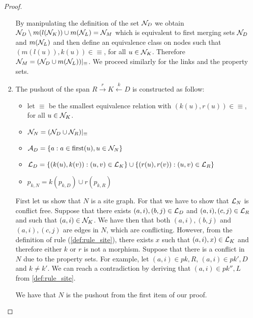 \begin{proof}
\begin{enumerate}
    By manipulating the definition of the set $\mathcal{N}_D$ we obtain $\mathcal{N}_D\setminus m(l(\mathcal{N}_K))\cup m(\mathcal{N}_L) = \mathcal{N}_M$ which is equivalent to first merging sets $\mathcal{N}_D$ and $m(\mathcal{N}_L)$ and then define an equivalence class on nodes such that $(m(l(u)),k(u))\in\equiv$, for all $u\in\mathcal{N}_K$. Therefore $\mathcal{N}_M = (\mathcal{N}_D\cup m(\mathcal{N}_L))|_{\equiv}$. We proceed similarly for the links and the property sets.

  \item The pushout of the span $R\overset{r}{\rightarrow}K\overset{k}{\leftarrow} D$  is constructed as follow:
    \begin{itemize}
    \item let $\equiv$ be the smallest equivalence relation with $(k(u),r(u))\in\equiv$, for all $u\in\mathcal{N}_K$.
    \item $\mathcal{N}_N = (\mathcal{N}_D\cup \mathcal{N}_R)|_{\equiv}$
    \item $\mathcal{A}_D = \{a: a\in \text{first}(u), u\in\mathcal{N}_N\}$
    \item $\mathcal{L}_D = \{(k(u),k(v)) : (u,v)\in\mathcal{L}_K\}\cup\{(r(u),r(v)) : (u,v)\in\mathcal{L}_R\}$
    \item $p_{k,N} = k(p_{k,D}) \cup r(p_{k,R})$
    \end{itemize}
    First let us show that $N$ is a site graph. For that we have to show that $\mathcal{L}_N$ is conflict free. Suppose that there exists $(a,i),(b,j)\in \mathcal{L}_D$ and $(a,i),(c,j)\in \mathcal{L}_R$ and such that $(a,i)\in\mathcal{N}_K$. We have then that both $(a,i),(b,j)$ and $(a,i),(c,j)$ are edges in $N$, which are conflicting. However, from the definition of rule (\autoref{def:rule_site}), there exists $x$ such that $(a,i),x)\in\mathcal{L}_K$ and therefore either $k$ or $r$ is not a morphism.
%
    Suppose that there is a conflict in $N$ due to the property sets. For example, let $(a,i)\in p{k,R}$, $(a,i)\in p{k',D}$ and $k\neq k'$. We can reach a contradiction by deriving that $(a,i)\in p{k'',L}$ from \autoref{def:rule_site}.

    We have that $N$ is the pushout from the first item of our proof.
  \end{enumerate}
\end{proof}





